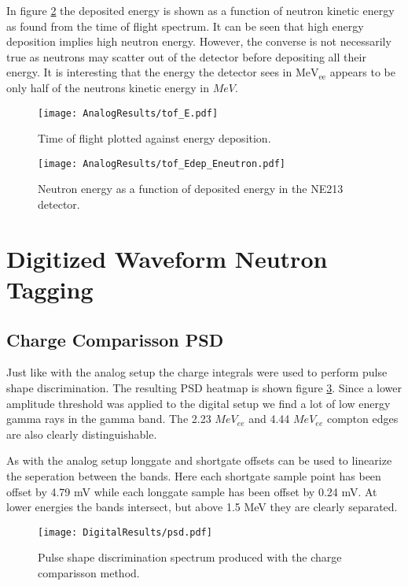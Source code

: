 \documentclass[main.tex]{subfiles}
\begin{document}
In figure \ref{fig:tof_Edep_Eneutron_a} the deposited energy is shown as a function of neutron kinetic energy as found from the time of flight spectrum. It can be seen that high energy deposition implies high neutron energy. However, the converse is not necessarily true as neutrons may scatter out of the detector before depositing all their energy. It is interesting that the energy the detector sees in $\text{MeV}_\text{ee}$ appears to be only half of the neutrons kinetic energy in  $MeV$.

\begin{figure}[ht]
    \centering
        \texttt{[image: AnalogResults/tof\_E.pdf]}
        \caption{Time of flight plotted against energy deposition.}
    \label{fig:tof_E_a} 
\end{figure}

\begin{figure}[ht]
    \centering
        \texttt{[image: AnalogResults/tof\_Edep\_Eneutron.pdf]}
        \caption{Neutron energy as a function of deposited energy in the NE213 detector.}
    \label{fig:tof_Edep_Eneutron_a} 
\end{figure}



\section{Digitized Waveform Neutron Tagging}

\subsection{Charge Comparisson PSD}
Just like with the analog setup the charge integrals were used to perform pulse shape discrimination. The resulting PSD heatmap is shown figure \ref{fig:psd_d}. Since a lower amplitude threshold was applied to the digital setup we find a lot of low energy gamma rays in the gamma band. The 2.23 $MeV_{ee}$ and 4.44 $MeV_{ee}$ compton edges are also clearly distinguishable. 

As with the analog setup longgate and shortgate offsets can be used to linearize the seperation between the bands. Here each shortgate sample point has been offset by 4.79 mV while each longgate sample has been offset by 0.24 mV. At lower energies the bands intersect, but above 1.5 MeV they are clearly separated.

\begin{figure}[ht]
    \centering
        \texttt{[image: DigitalResults/psd.pdf]}
        \caption{Pulse shape discrimination spectrum produced with the charge comparisson method.}
        \label{fig:psd_d}
\end{figure}
\end{document}

